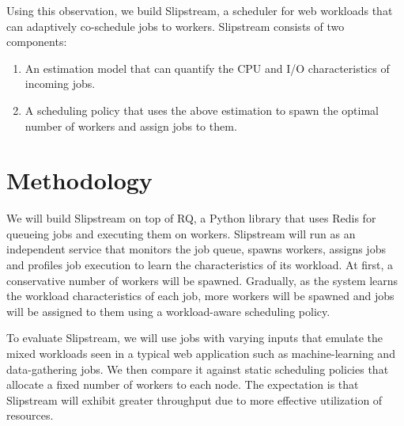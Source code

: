 \documentclass{proc}
\begin{document}
Using this observation, we build Slipstream, a scheduler for web workloads that
can adaptively co-schedule jobs to workers. Slipstream consists of two
components:
\begin{enumerate}
  \item An estimation model that can quantify the CPU and I/O characteristics of
  incoming jobs.
  \item A scheduling policy that uses the above estimation to spawn the optimal
  number of workers and assign jobs to them.
\end{enumerate}

\section{Methodology}

We will build Slipstream on top of RQ, a Python library that uses Redis for
queueing jobs and executing them on workers. Slipstream will run as an
independent service that monitors the job queue, spawns workers, assigns jobs
and profiles job execution to learn the characteristics of its workload. At
first, a conservative number of workers will be spawned. Gradually, as the
system learns the workload characteristics of each job, more workers will be
spawned and jobs will be assigned to them using a workload-aware scheduling policy.

To evaluate Slipstream, we will use jobs with varying inputs that emulate the
mixed workloads seen in a typical web application such as machine-learning and
data-gathering jobs. We then compare it against static scheduling policies that
allocate a fixed number of workers to each node. The expectation is that
Slipstream will exhibit greater throughput due to more effective utilization of
resources.
\end{document}
